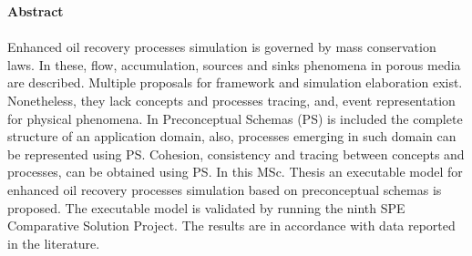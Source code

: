 







\textbf{\LARGE Abstract}\\\\
Enhanced oil recovery processes simulation is governed by mass conservation laws. In these, flow, accumulation, sources and sinks phenomena in porous media are described. Multiple proposals for framework and simulation elaboration exist. Nonetheless, they lack concepts and processes tracing, and, event representation for physical phenomena. In Preconceptual Schemas (PS) is included the complete structure of an application domain, also, processes emerging in such domain can be represented using PS. Cohesion, consistency and tracing between concepts and processes, can be obtained using PS. In this MSc. Thesis an executable model for enhanced oil recovery processes simulation based on preconceptual schemas is proposed. The executable model is validated by running the ninth SPE Comparative Solution Project. The results are in accordance with data reported in the literature.\\

